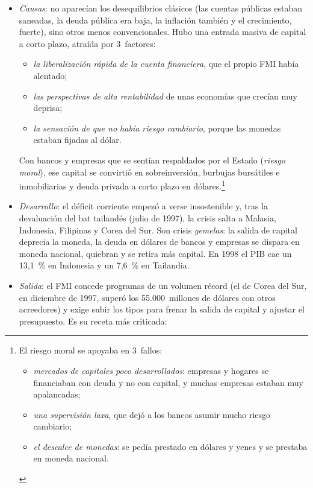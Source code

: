 \documentclass[11pt]{article}
\begin{document}
\begin{itemize}
\item \emph{Causas}: no aparecían los desequilibrios clásicos (las cuentas públicas estaban saneadas, la deuda pública era baja, la inflación también y el crecimiento, fuerte), sino otros menos convencionales. Hubo una entrada masiva de capital a corto plazo, atraída por 3~factores:
  \begin{itemize}
  \item \emph{la liberalización rápida de la cuenta financiera}, que el propio FMI había alentado;
  \item \emph{las perspectivas de alta rentabilidad} de unas economías que crecían muy deprisa;
  \item \emph{la sensación de que no había riesgo cambiario}, porque las monedas estaban fijadas al dólar.
  \end{itemize}
  Con bancos y empresas que se sentían respaldados por el Estado (\emph{riesgo moral}), ese capital se convirtió en sobreinversión, burbujas bursátiles e inmobiliarias y deuda privada a corto plazo en dólares.\footnote{El riesgo moral se apoyaba en 3~fallos:
    \begin{itemize}
    \item \emph{mercados de capitales poco desarrollados}: empresas y hogares se financiaban con deuda y no con capital, y muchas empresas estaban muy apalancadas;
    \item \emph{una supervisión laxa}, que dejó a los bancos asumir mucho riesgo cambiario;
    \item \emph{el descalce de monedas}: se pedía prestado en dólares y yenes y se prestaba en moneda nacional.
    \end{itemize}}
\item \emph{Desarrollo}: el déficit corriente empezó a verse insostenible y, tras la devaluación del bat tailandés (julio de 1997), la crisis salta a Malasia, Indonesia, Filipinas y Corea del Sur. Son crisis \emph{gemelas}: la salida de capital deprecia la moneda, la deuda en dólares de bancos y empresas se dispara en moneda nacional, quiebran y se retira más capital\nocite{Krugman1999Balance}. En 1998 el PIB cae un 13,1~\% en Indonesia y un 7,6~\% en Tailandia.
\item \emph{Salida}: el FMI concede programas de un volumen récord (el de Corea del Sur, en diciembre de 1997, superó los 55.000~millones de dólares con otros acreedores) y exige subir los tipos para frenar la salida de capital y ajustar el presupuesto. Es su receta más criticada:

\end{itemize}
\end{document}
